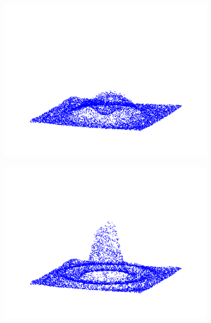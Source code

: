 \begin{figure}
\begin{subfigure}{0.33\textwidth}
    \centering
    \includegraphics[width=1.\textwidth]{img/distrib_70.png}
\end{subfigure}%
\begin{subfigure}{0.33\textwidth}
    \centering
    \includegraphics[width=1.\textwidth]{img/distrib_120.png}
\end{subfigure}%
\begin{subfigure}{0.33\textwidth}
    \centering

\end{subfigure}
\end{figure}
